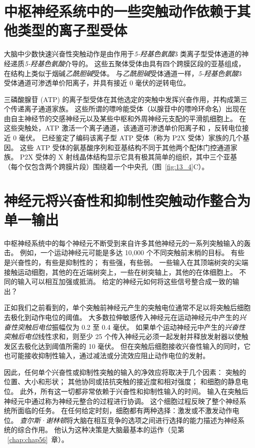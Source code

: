 \section{中枢神经系统中的一些突触动作依赖于其他类型的离子型受体}

大脑中少数快速兴奋性突触动作是由作用于\textit{5-羟基色氨酸}3 类离子型受体通道的神经递质\textit{5-羟基色氨酸}介导的。
这些五聚体受体由具有四个跨膜区段的亚基组成，在结构上类似于烟碱\textit{乙酰胆碱}受体。
与\textit{乙酰胆碱}受体通道一样，\textit{5-羟基色氨酸}3 受体通道可渗透单价阳离子，并具有接近 0 毫伏的逆转电位。


三磷酸腺苷 (ATP) 的离子型受体在其他选定的突触中发挥兴奋作用，并构成第三个传递离子通道家族。
这些所谓的嘌呤能受体（以腺苷中的嘌呤环命名）出现在由自主神经节的交感神经元以及某些中枢和外周神经元支配的平滑肌细胞上。
在这些突触处，ATP 激活一个离子通道，该通道可渗透单价阳离子和 ，反转电位接近 0 毫伏。
已经鉴定了编码该离子型 ATP 受体（称为 P2X 受体）家族的几个基因。
这些 ATP 受体的氨基酸序列和亚基结构不同于其他两个配体门控通道家族。
P2X 受体的 X 射线晶体结构显示它具有极其简单的组织，其中三个亚基（每个仅包含两个跨膜片段）围绕着一个中央孔（图~\ref{fig:13_4}C）。



\section{神经元将兴奋性和抑制性突触动作整合为单一输出}

中枢神经系统中的每个神经元不断受到来自许多其他神经元的一系列突触输入的轰击。
例如，一个运动神经元可能是多达 10,000 个不同突触前末梢的目标。
有些是兴奋性的，有些是抑制性的；
有些强，有些弱。
一些输入在其顶端树突的尖端接触运动细胞，其他的在近端树突上，一些在树突轴上，其他的在体细胞上。
不同的输入可以相互加强或抵消。
给定的神经元如何将这些信号整合成一致的输出？


正如我们之前看到的，单个突触前神经元产生的突触电位通常不足以将突触后细胞去极化到动作电位的阈值。
大多数拉伸敏感传入神经元在运动神经元中产生的\textit{兴奋性突触后电位}振幅仅为 0.2 至 0.4 毫伏。
如果单个运动神经元中产生的\textit{兴奋性突触后电位}线性求和，则至少 25 个传入神经元必须一起发射并释放发射器以使触发区去极化达到阈值所需的 10 毫伏。
但在突触后细胞接收兴奋性输入的同时，它也可能接收抑制性输入，通过减法或分流效应阻止动作电位的发射。


因此，任何单个兴奋性或抑制性突触的输入的净效应将取决于几个因素：
突触的位置、大小和形状；
其他协同或拮抗突触的接近度和相对强度；
和细胞的静息电位。 
此外，所有这一切都非常依赖于兴奋性和抑制性输入的时间。
输入在突触后神经元中通过称为神经元整合的过程进行协调。
这个细胞过程反映了整个神经系统所面临的任务。
在任何给定时刻，细胞都有两种选择：激发或不激发动作电位。
\textit{查尔斯·谢林顿}将大脑在相互竞争的选项之间进行选择的能力描述为神经系统的综合作用。
他认为这种决策是大脑最基本的运作（见第 ~\ref{chap:chap56}~章）。



